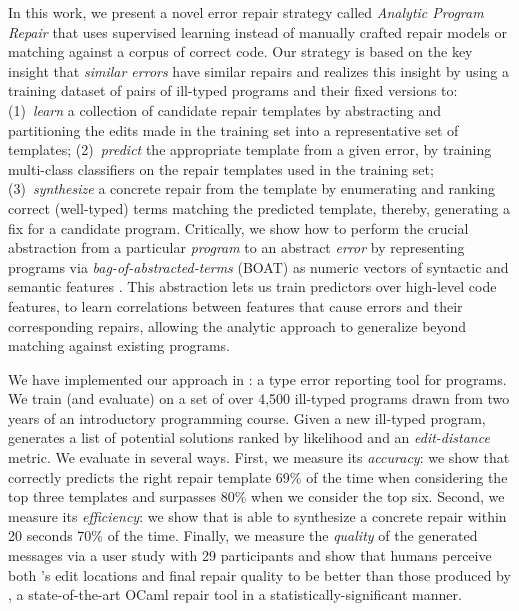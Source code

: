 %
In this work, we present a novel error repair strategy called \emph{Analytic
Program Repair} that uses supervised learning instead of manually crafted repair
models or matching against a corpus of correct code.
%
Our strategy is based on the key insight that \emph{similar errors} have similar
repairs and realizes this insight by using a training dataset of pairs of
ill-typed programs and their fixed versions to:
%
(1)~\emph{learn} a collection of candidate repair templates
    by abstracting and partitioning the edits made in the
    training set into a representative set of templates;
%
(2)~\emph{predict} the appropriate template from a given error,
    by training multi-class classifiers on the repair templates
    used in the training set;
%
(3)~\emph{synthesize} a concrete repair from the template
   by enumerating and ranking correct (\eg well-typed)
   terms matching the predicted template,
%
thereby, generating a fix for a candidate program.
%
Critically, we show how to perform the crucial abstraction
from a particular \emph{program} to an abstract \emph{error}
by representing programs via \emph{bag-of-abstracted-terms} (BOAT)
\ie as numeric vectors of syntactic and semantic features \citep{Seidel2017-ko}.
%
This abstraction lets us train predictors over high-level
code features, \ie to learn correlations between features
that cause errors and their corresponding repairs, allowing
the analytic approach to generalize beyond matching against
existing programs.

\mypara{\toolname}
%
We have implemented our approach in \toolname: a type error reporting
tool for \ocaml programs. We train (and evaluate) \toolname on a set of
over 4,500 ill-typed \ocaml programs drawn from two years of an
introductory programming course.
%
Given a new ill-typed program, \toolname generates a list of potential
solutions ranked by likelihood and an \emph{edit-distance} metric.
We evaluate \toolname in several
ways.
%
First, we measure its \emph{accuracy}: we show that \toolname correctly predicts
the right repair template 69\% of the time when considering the top three
templates and surpasses 80\% when we consider the top six.
%
Second, we measure its \emph{efficiency}: we show that \toolname is able to
synthesize a concrete repair within 20 seconds 70\% of the time.
%
Finally, we measure the \emph{quality} of the generated messages via a user
study with 29 participants and show that humans perceive both \toolname's edit
locations and final repair quality to be better than those produced by \seminal,
a state-of-the-art OCaml repair tool \citep{Lerner2007-dt} in a
statistically-significant manner.


